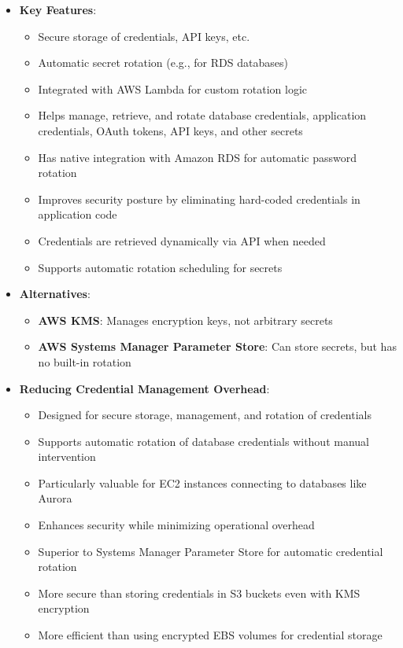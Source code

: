 \documentclass[11pt,a4paper]{report}
\begin{document}
\begin{itemize}
  \item \textbf{Key Features}:
\begin{itemize}
  \item Secure storage of credentials, API keys, etc.
  \item Automatic secret rotation (e.g., for RDS databases)
  \item Integrated with AWS Lambda for custom rotation logic
  \item Helps manage, retrieve, and rotate database credentials, application credentials, OAuth tokens, API keys, and other secrets
  \item Has native integration with Amazon RDS for automatic password rotation
  \item Improves security posture by eliminating hard-coded credentials in application code
  \item Credentials are retrieved dynamically via API when needed
  \item Supports automatic rotation scheduling for secrets
\end{itemize}
  \item \textbf{Alternatives}:
\begin{itemize}
  \item \textbf{AWS KMS}: Manages encryption keys, not arbitrary secrets
  \item \textbf{AWS Systems Manager Parameter Store}: Can store secrets, but has no built-in rotation
\end{itemize}
  \item \textbf{Reducing Credential Management Overhead}:
\begin{itemize}
  \item Designed for secure storage, management, and rotation of credentials
  \item Supports automatic rotation of database credentials without manual intervention
  \item Particularly valuable for EC2 instances connecting to databases like Aurora
  \item Enhances security while minimizing operational overhead
  \item Superior to Systems Manager Parameter Store for automatic credential rotation
  \item More secure than storing credentials in S3 buckets even with KMS encryption
  \item More efficient than using encrypted EBS volumes for credential storage
\end{itemize}

\end{itemize}
\end{document}
